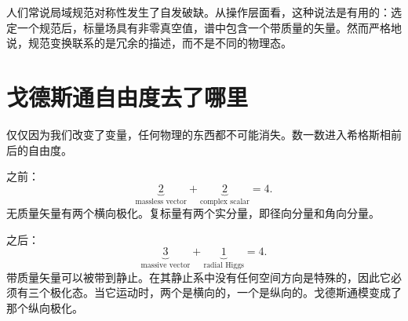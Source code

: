 \begin{classroomqa}
\end{classroomqa}

\begin{classroomqa}
\end{classroomqa}

人们常说局域规范对称性发生了自发破缺。从操作层面看，这种说法是有用的：选定一个规范后，标量场具有非零真空值，谱中包含一个带质量的矢量。然而严格地说，规范变换联系的是冗余的描述，而不是不同的物理态。

\section{戈德斯通自由度去了哪里}

仅仅因为我们改变了变量，任何物理的东西都不可能消失。数一数进入希格斯相前后的自由度。

之前：
\begin{equation}
  \underbrace{2}_{\text{massless vector}}
  +
  \underbrace{2}_{\text{complex scalar}}
  =4.
\end{equation}
无质量矢量有两个横向极化。复标量有两个实分量，即径向分量和角向分量。

之后：
\begin{equation}
  \underbrace{3}_{\text{massive vector}}
  +
  \underbrace{1}_{\text{radial Higgs}}
  =4.
  \label{eq:l08-degree-count}
\end{equation}
带质量矢量可以被带到静止。在其静止系中没有任何空间方向是特殊的，因此它必须有三个极化态。当它运动时，两个是横向的，一个是纵向的。戈德斯通模变成了那个纵向极化。

